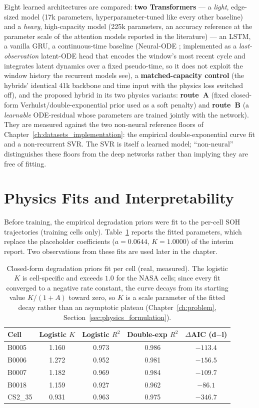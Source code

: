 Eight learned architectures are compared: \textbf{two Transformers} --- a
\emph{light}, edge-sized model (17k parameters, hyperparameter-tuned like every
other baseline) and a \emph{heavy}, high-capacity model (225k parameters, an
accuracy reference at the parameter scale of the attention models reported in
the literature) --- an LSTM, a vanilla GRU, a continuous-time baseline
(Neural-ODE \cite{chen_node}; implemented as a \emph{last-observation}
latent-ODE head that encodes the window's most recent cycle and integrates
latent dynamics over a fixed pseudo-time, so it does not exploit the window
history the recurrent models see), a \textbf{matched-capacity control} (the hybrids' identical 41k
backbone and time input with the physics loss switched off), and the proposed
hybrid in its two physics variants: \textbf{route~A} (fixed closed-form
Verhulst/double-exponential prior used as a soft penalty) and \textbf{route~B}
(a \emph{learnable} ODE-residual whose parameters are trained jointly with the
network). They are measured against the two non-neural reference floors of
Chapter~\ref{ch:datasets_implementation}: the empirical double-exponential curve
fit and a non-recurrent SVR. The SVR is itself a learned model; ``non-neural''
distinguishes these floors from the deep networks rather than implying they are
free of fitting.

\section{Physics Fits and Interpretability}
\label{sec:physics_interpretability}

Before training, the empirical degradation priors were fit to the per-cell SOH
trajectories (training cells only). Table~\ref{tab:prior_fits} reports the
fitted parameters, which replace the placeholder coefficients
($a{=}0.0644$, $K{=}1.0000$) of the interim report. Two observations from these
fits are used later in the chapter.

\begin{table}[H]
\centering
\caption{Closed-form degradation priors fit per cell (real, measured). The
logistic $K$ is cell-specific and exceeds $1.0$ for the NASA cells; since every
fit converged to a negative rate constant, the curve decays from its starting
value $K/(1+A)$ toward zero, so $K$ is a scale parameter of the fitted decay
rather than an asymptotic plateau (Chapter~\ref{ch:problem},
Section~\ref{sec:physics_formulation}).}
\label{tab:prior_fits}
\small
\begin{tabular}{l c c c c}
\toprule
\textbf{Cell} & \textbf{Logistic $K$} & \textbf{Logistic $R^2$} & \textbf{Double-exp $R^2$} & \textbf{$\Delta$AIC (d$-$l)} \\
\midrule
B0005   & 1.160 & 0.973 & 0.986 & $-113.4$ \\
B0006   & 1.272 & 0.952 & 0.981 & $-156.5$ \\
B0007   & 1.182 & 0.969 & 0.984 & $-109.7$ \\
B0018   & 1.159 & 0.927 & 0.962 & $-86.1$ \\
CS2\_35 & 0.931 & 0.963 & 0.975 & $-346.7$ \\
\bottomrule
\end{tabular}
\end{table}

